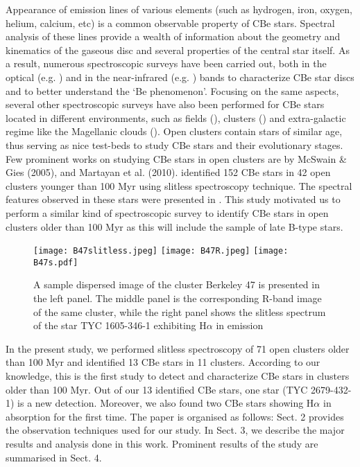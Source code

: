 \documentclass{jaa}
\begin{document}
Appearance of emission lines of various elements (such as hydrogen, iron, oxygen, helium, calcium, etc) is a common observable property of CBe stars. Spectral analysis of these lines provide a wealth of information about the geometry and kinematics of the gaseous disc and several properties of the central star itself. As a result, numerous spectroscopic surveys have been carried out, both in the optical (e.g. \citealt{1982AndrillatF, 1986Hanuschik, 1986Dachs, 2012Koubsky, 2017Arcos, 2019Klement}) and in the near-infrared (e.g. \citealt{2000Clark, 2001Steele, 2011Granada}) bands to characterize CBe star discs and to better understand the ‘Be phenomenon'. Focusing on the same aspects, several other spectroscopic surveys have also been performed for CBe stars located in different environments, such as fields (\citealt{2020Gourav}), clusters (\citealt{2008Mathew}) and extra-galactic regime like the Magellanic clouds (\citealt{2012Paul}).
Open clusters contain stars of similar age, thus serving as nice test-beds to study CBe stars and their evolutionary stages. Few prominent works on studying CBe stars in open clusters are by McSwain \& Gies (2005), \cite{2008Mathew} and Martayan et al. (2010). \cite{2008Mathew} identified 152 CBe stars in 42 open clusters younger than 100 Myr using slitless spectroscopy technique. The spectral features observed in these stars were presented in \cite{2011Mathew}. This study motivated us to perform a similar kind of spectroscopic survey to identify CBe stars in open clusters older than 100 Myr as this will include the sample of late B-type stars.

\begin{figure*}[h!]
\centering 
\texttt{[image: B47slitless.jpeg]}
\texttt{[image: B47R.jpeg]}
\texttt{[image: B47s.pdf]}
\caption{A sample dispersed image of the cluster Berkeley 47 is presented in the left panel. The middle panel is the corresponding R-band image of the same cluster, while the right panel shows the slitless spectrum of the star TYC 1605-346-1 exhibiting H$\alpha$ in emission} 
\end{figure*}

In the present study, we performed slitless spectroscopy of 71 open clusters older than 100 Myr and identified 13 CBe stars in 11 clusters. According to our knowledge, this is the first study to detect and characterize CBe stars in clusters older than 100 Myr. Out of our 13 identified CBe stars, one star (TYC 2679-432-1) is a new detection. Moreover, we also found two CBe stars showing H$\alpha$ in absorption for the first time. The paper is organised as follows: Sect. 2 provides the observation techniques used for our study. In Sect. 3, we describe the major results and analysis done in this work. Prominent results of the study are summarised in Sect. 4.
\end{document}
